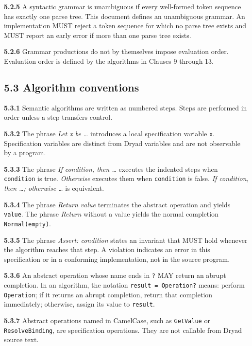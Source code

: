 \documentclass[
  english,
  11pt,
  a4paper,
]{article}
\begin{document}
\textbf{5.2.5} A syntactic grammar is unambiguous if every well-formed
token sequence has exactly one parse tree. This document defines an
unambiguous grammar. An implementation MUST reject a token sequence for
which no parse tree exists and MUST report an early error if more than
one parse tree exists.

\textbf{5.2.6} Grammar productions do not by themselves impose
evaluation order. Evaluation order is defined by the algorithms in
Clauses 9 through 13.

\subsection{5.3 Algorithm conventions}\label{algorithm-conventions}

\textbf{5.3.1} Semantic algorithms are written as numbered steps. Steps
are performed in order unless a step transfers control.

\textbf{5.3.2} The phrase \emph{Let x be \ldots{}} introduces a local
specification variable \texttt{x}. Specification variables are distinct
from Dryad variables and are not observable by a program.

\textbf{5.3.3} The phrase \emph{If condition, then \ldots{}} executes
the indented steps when \texttt{condition} is true. \emph{Otherwise}
executes them when \texttt{condition} is false. \emph{If condition, then
\ldots; otherwise \ldots{}} is equivalent.

\textbf{5.3.4} The phrase \emph{Return value} terminates the abstract
operation and yields \texttt{value}. The phrase \emph{Return} without a
value yields the normal completion \texttt{Normal(empty)}.

\textbf{5.3.5} The phrase \emph{Assert: condition} states an invariant
that MUST hold whenever the algorithm reaches that step. A violation
indicates an error in this specification or in a conforming
implementation, not in the source program.

\textbf{5.3.6} An abstract operation whose name ends in \texttt{?} MAY
return an abrupt completion. In an algorithm, the notation
\texttt{result\ =\ Operation?} means: perform \texttt{Operation}; if it
returns an abrupt completion, return that completion immediately;
otherwise, assign its value to \texttt{result}.

\textbf{5.3.7} Abstract operations named in CamelCase, such as
\texttt{GetValue} or \texttt{ResolveBinding}, are specification
operations. They are not callable from Dryad source text.
\end{document}
